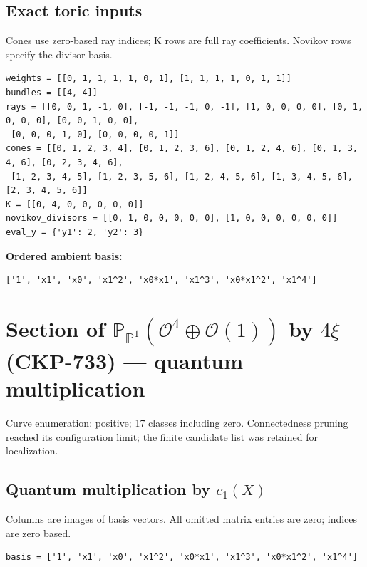 \documentclass[10pt,a4paper]{article}
\begin{document}
\subsection*{Exact toric inputs}
Cones use zero-based ray indices; K rows are full ray coefficients. Novikov rows specify the divisor basis.

\begin{lstlisting}
weights = [[0, 1, 1, 1, 1, 0, 1], [1, 1, 1, 1, 0, 1, 1]]
bundles = [[4, 4]]
rays = [[0, 0, 1, -1, 0], [-1, -1, -1, 0, -1], [1, 0, 0, 0, 0], [0, 1, 0, 0, 0], [0, 0, 1, 0, 0],
 [0, 0, 0, 1, 0], [0, 0, 0, 0, 1]]
cones = [[0, 1, 2, 3, 4], [0, 1, 2, 3, 6], [0, 1, 2, 4, 6], [0, 1, 3, 4, 6], [0, 2, 3, 4, 6],
 [1, 2, 3, 4, 5], [1, 2, 3, 5, 6], [1, 2, 4, 5, 6], [1, 3, 4, 5, 6], [2, 3, 4, 5, 6]]
K = [[0, 4, 0, 0, 0, 0, 0]]
novikov_divisors = [[0, 1, 0, 0, 0, 0, 0], [1, 0, 0, 0, 0, 0, 0]]
eval_y = {'y1': 2, 'y2': 3}
\end{lstlisting}

\textbf{Ordered ambient basis:}
\begin{lstlisting}
['1', 'x1', 'x0', 'x1^2', 'x0*x1', 'x1^3', 'x0*x1^2', 'x1^4']
\end{lstlisting}

\clearpage\section*{Section of $\mathbb P_{\mathbb P^{1}}(\mathcal O^{4}\oplus \mathcal O(1))$ by $4\xi $ (CKP-733) --- quantum multiplication}

Curve enumeration: positive; 17 classes including zero.
Connectedness pruning reached its configuration limit; the finite candidate list was retained for localization.
\subsection*{Quantum multiplication by $c_1(X)$}
Columns are images of basis vectors. All omitted matrix entries are zero; indices are zero based.

\begin{lstlisting}
basis = ['1', 'x1', 'x0', 'x1^2', 'x0*x1', 'x1^3', 'x0*x1^2', 'x1^4']
\end{lstlisting}
\end{document}
